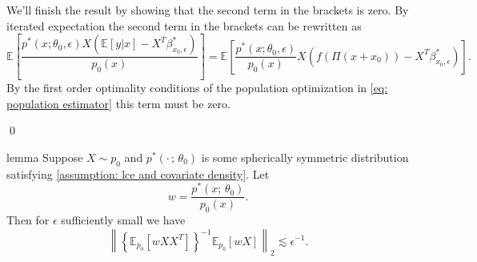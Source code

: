 \documentclass[11pt]{article}
\begin{document}
We'll finish the result by showing that the second term in the brackets is zero. By iterated expectation the second term in the brackets can be rewritten as 
\begin{equation*}
    \mathbb{E}\left[\frac{p^*(x;\theta_0, \epsilon) X\left(\mathbb{E}[y|x] - X^T\beta^*_{x_0, \epsilon}\right)}{p_0(x)}\right] = \mathbb{E}\left[\frac{p^*(x;\theta_0, \epsilon)}{p_0(x)} X\left(f(\Pi(x+x_0)) - X^T\beta^*_{x_0, \epsilon}\right)\right].
\end{equation*}
By the first order optimality conditions of the population optimization in \cref{eq: population estimator} this term must be zero. 

\qed{}

\begin{restatable}{lemma}{} \label{lemma: pnorm bound} Suppose $X\sim p_0$ and $p^*(\cdot\,;\, \theta_0)$ is some spherically symmetric distribution satisfying \cref{assumption: lce and covariate density}. Let
\[w =  \frac{p^*(x;\,\theta_0)}{p_0(x)}.\]
Then for $\epsilon$ sufficiently small we have
\begin{equation}
   \left\|\left\{\mathbb{E}_{p_{0}}[wXX^{T}]\right\}^{-1}\mathbb{E}_{p_{0}}[wX]\right\|_2 \lesssim \epsilon^{-1}.
\end{equation}
\end{restatable}
\end{document}
